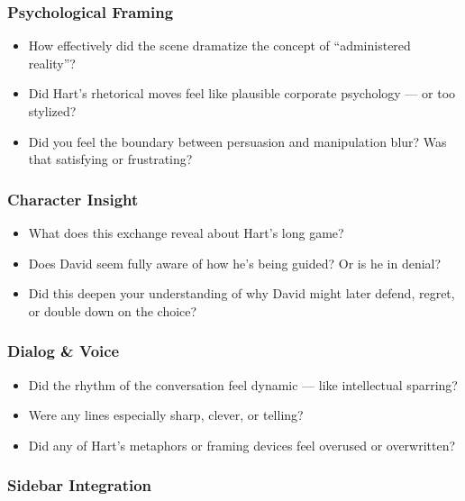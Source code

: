     \subsubsection*{Psychological Framing}
    
    \begin{itemize}
      \item How effectively did the scene dramatize the concept of ``administered reality''?
      \item Did Hart’s rhetorical moves feel like plausible corporate psychology — or too stylized?
      \item Did you feel the boundary between persuasion and manipulation blur? Was that satisfying or frustrating?
    \end{itemize}
    
    \subsubsection*{Character Insight}
    
    \begin{itemize}
      \item What does this exchange reveal about Hart’s long game?
      \item Does David seem fully aware of how he's being guided? Or is he in denial?
      \item Did this deepen your understanding of why David might later defend, regret, or double down on the choice?
    \end{itemize}
    
    \subsubsection*{Dialog \& Voice}
    
    \begin{itemize}
      \item Did the rhythm of the conversation feel dynamic — like intellectual sparring?
      \item Were any lines especially sharp, clever, or telling?
      \item Did any of Hart’s metaphors or framing devices feel overused or overwritten?
    \end{itemize}
    
    \subsubsection*{Sidebar Integration}
    
